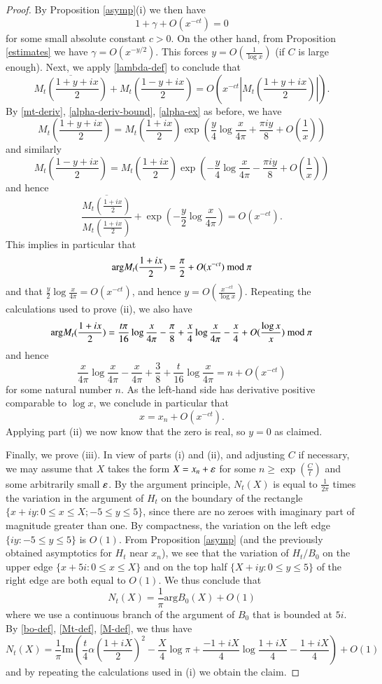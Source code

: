 \begin{proof}
By Proposition \ref{asymp}(i) we then have
$$ 1 + \gamma + O( x^{-ct} ) = 0$$
for some small absolute constant $c>0$.
On the other hand, from Proposition \ref{estimates} we have $\gamma = O(x^{-y/2})$.  This forces $y = O( \frac{1}{\log x} )$ (if $C$ is large enough).  Next, we apply \eqref{lambda-def} to conclude that
$$ \overline{M_t(\frac{1+y+ix}{2})} + M_t(\frac{1-y+ix}{2}) = O( x^{-ct} |M_t(\frac{1+y+ix}{2})| ).$$
By \eqref{mt-deriv}, \eqref{alpha-deriv-bound}, \eqref{alpha-ex} as before, we have
$$ M_t(\frac{1+y+ix}{2}) = M_t(\frac{1+ix}{2}) \exp( \frac{y}{4} \log \frac{x}{4\pi} + \frac{\pi i y}{8} + O( \frac{1}{x} ) )$$
and similarly
$$ M_t(\frac{1-y+ix}{2}) = M_t(\frac{1+ix}{2}) \exp( -\frac{y}{4} \log \frac{x}{4\pi} - \frac{\pi i y}{8} + O( \frac{1}{x} ) )$$
and hence 
$$ \frac{\overline{M_t(\frac{1+ix}{2})}}{M_t(\frac{1+ix}{2})} + \exp( -\frac{y}{2} \log \frac{x}{4\pi} ) = O( x^{-ct} ).$$
This implies in particular that
$$ \mathrm{arg} M_t(\frac{1+ix}{2})  = \frac{\pi}{2} + O(x^{-ct}) \hbox{ mod } \pi$$
and that $\frac{y}{2} \log \frac{x}{4\pi} = O( x^{-ct})$, and hence $y = O( \frac{x^{-ct}}{\log x} )$.  Repeating the calculations used to prove (ii), we also have
$$
\mathrm{arg} M_t(\frac{1+ix}{2}) = \frac{t \pi}{16} \log \frac{x}{4\pi} - \frac{\pi}{8} 
+ \frac{x}{4} \log \frac{x}{4\pi} - \frac{x}{4} + O( \frac{\log x}{x} ) \hbox{ mod } \pi 
$$
and hence
$$ \frac{x}{4\pi} \log \frac{x}{4\pi} - \frac{x}{4\pi} + \frac{3}{8} + \frac{t}{16} \log \frac{x}{4\pi} = n + O( x^{-ct})$$
for some natural number $n$.  As the left-hand side has derivative positive comparable to $\log x$, we conclude in particular that
$$ x = x_n + O(x^{-ct}).$$
Applying part (ii) we now know that the zero is real, so $y=0$ as claimed.

Finally, we prove (iii).  In view of parts (i) and (ii), and adjusting $C$ if necessary, we may assume that $X$ takes the form $X = x_n+\varepsilon$ for some $n \geq \exp( \frac{C}{t})$ and some arbitrarily small $\varepsilon$.  By the argument principle, $N_t(X)$ is equal to $\frac{1}{2\pi}$ times the variation in the argument of $H_t$ on the boundary of the rectangle $\{ x+iy: 0 \leq x \leq X; -5 \leq y \leq 5 \}$, since there are no zeroes with imaginary part of magnitude greater than one.  By compactness, the variation on the left edge $\{ iy: -5 \leq y \leq 5 \}$ is $O(1)$.  From Proposition \ref{asymp} (and the previously obtained asymptotics for $H_t$ near $x_n$), we see that the variation of $H_t / B_0$ on the upper edge $\{ x+5i: 0 \leq x \leq X \}$ and on the top half $\{ X+iy: 0 \leq y \leq 5 \}$ of the right edge are both equal to $O(1)$.  We thus conclude that
$$ N_t(X) = \frac{1}{\pi} \mathrm{arg} B_0(X) + O(1)$$
where we use a continuous branch of the argument of $B_0$ that is bounded at $5i$.  By \eqref{bo-def}, \eqref{Mt-def}, \eqref{M-def}, we thus have
$$ N_t(X) = \frac{1}{\pi} \mathrm{Im} (\frac{t}{4} \alpha(\frac{1+iX}{2})^2 
- \frac{X}{4} \log \pi + \frac{-1+iX}{4} \log \frac{1+iX}{4} - \frac{1+iX}{4} ) + O(1)$$
and by repeating the calculations used in (i) we obtain the claim.
\end{proof}




